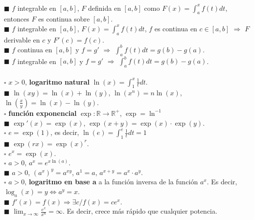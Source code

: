 \documentclass[11pt,a4paper]{article}
\begin{document}
\dotfill\\

$\blacksquare$ $f$ integrable en $[a,b]$, $F$ definida en $[a,b]$ como $F(x) = \int_a^x f(t)dt$, entonces $F$ es continua sobre $[a,b]$.\\
$\blacksquare$ $f$ integrable en $[a,b]$, $F(x) = \int_a^x f(t)dt$, $f$ es continua en $c \in [a,b]$ $\Rightarrow$ $F$ derivable en $c$ y $F'(c)=f(c)$.\\
$\blacksquare$ $f$ continua en $[a,b]$ y $f=g'$ $\Rightarrow$ $\int_a^b f(t)dt = g(b) - g(a)$.\\
$\blacksquare$ $f$ integrable en $[a,b]$ y $f=g'$ $\Rightarrow$ $\int_a^b f(t)dt = g(b) - g(a)$.\\

\dotfill\\

$\square$ $x>0$, \textbf{logaritmo natural} $\ln(x) = \int_1^x \frac{1}{t}dt$.\\
$\blacksquare$ $\ln(xy) = \ln(x)+\ln(y)$, $ \ln(x^n) = n\ln(x)$, $\ln(\frac{x}{y}) = \ln(x)-\ln(y)$.\\
$\square$ \textbf{funci\'on exponencial} $\exp : \mathbb{R} \rightarrow \mathbb{R}^+$, $\exp = \ln^{-1}$\\
$\blacksquare$ $\exp'(x) = \exp(x)$, $\exp(x+y) = \exp(x) \cdot \exp(y)$.\\
$\square$ $e = \exp(1)$, es decir, $\ln(e) = \int_1^e\frac{1}{t}dt = 1$\\
$\blacksquare$ $\exp(rx) = \exp(x)^r$.\\
$\square$ $e^x = \exp(x)$.\\
$\square$ $a>0$, $a^x = e^{x\ln(a)}$.\\
$\blacksquare$ $a>0$, $(a^x)^y = a^{xy}$, $a^1 = a$, $a^{x+y} = a^x \cdot a^y$.\\
$\square$ $a>0$, \textbf{logaritmo en base a} a la funci\'on inversa de la funci\'on $a^x$. Es decir, $\log_a(x) = y \iff a^y=x$.\\
$\blacksquare$ $f'(x) = f(x) \Rightarrow \exists c / f(x)=ce^x$.\\
$\blacksquare$ $\lim_{x \to \infty} \frac{e^x}{x^n} = \infty$. Es decir, crece m\'as r\'apido que cualquier potencia.\\

\dotfill\\
\end{document}
